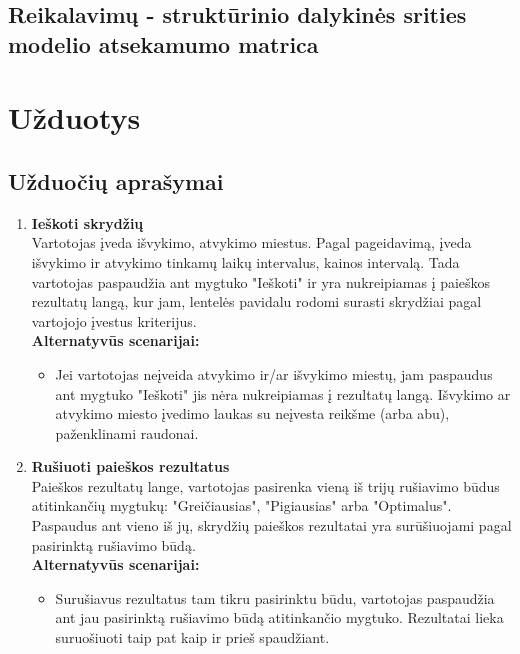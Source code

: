 \documentclass{VUMIFPSkursinis}
\begin{document}
            \subsection{Reikalavimų - struktūrinio dalykinės srities modelio atsekamumo matrica}
      
        \section{Užduotys}
            \subsection{Užduočių aprašymai}
            
                \begin{enumerate}[label=\textbf{U\arabic*}.]

                    \item \textbf{Ieškoti skrydžių}\\
                    Vartotojas įveda išvykimo, atvykimo miestus. Pagal pageidavimą, įveda išvykimo ir atvykimo tinkamų laikų intervalus, kainos intervalą. Tada vartotojas paspaudžia ant mygtuko "Ieškoti" ir yra nukreipiamas į paieškos rezultatų langą, kur jam, lentelės pavidalu rodomi surasti skrydžiai pagal vartojojo įvestus kriterijus.
                    \\\textbf{Alternatyvūs scenarijai:}
                    \begin{itemize}
                        \item Jei vartotojas neįveida atvykimo ir/ar išvykimo miestų, jam paspaudus ant mygtuko "Ieškoti" jis nėra nukreipiamas į rezultatų langą. Išvykimo ar atvykimo miesto įvedimo laukas su neįvesta reikšme (arba abu), paženklinami raudonai.
                    \end{itemize}

                    \item \textbf{Rušiuoti paieškos rezultatus}\\
                    Paieškos rezultatų lange, vartotojas pasirenka vieną iš trijų rušiavimo būdus atitinkančių mygtukų: "Greičiausias", "Pigiausias" arba "Optimalus". Paspaudus ant vieno iš jų, skrydžių paieškos rezultatai yra surūšiuojami pagal pasirinktą rušiavimo būdą.
                    \\\textbf{Alternatyvūs scenarijai:}
                    \begin{itemize}
                        \item Surušiavus rezultatus tam tikru pasirinktu būdu, vartotojas paspaudžia ant jau pasirinktą rušiavimo būdą atitinkančio mygtuko. Rezultatai lieka suruošiuoti taip pat kaip ir prieš spaudžiant. 
                    \end{itemize}


\end{enumerate}
\end{document}
